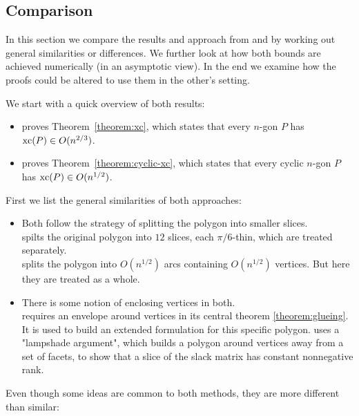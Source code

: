 \subsection{Comparison}

In this section we compare the results and approach from \cite{shitov2020sublinear} and \cite{kwan2020extension} by working out general similarities or differences. We further look at how both bounds are achieved numerically (in an asymptotic view). In the end we examine how the proofs could be altered to use them in the other's setting.

We start with a quick overview of both results:

\begin{itemize}
  \item \cite{shitov2020sublinear} proves Theorem~\ref{theorem:xc}, which states that every $n$-gon $P$ has $\operatorname{xc}(P) \in O(n^{2/3})$.
  \item \cite{kwan2020extension} proves Theorem~\ref{theorem:cyclic-xc}, which states that every cyclic $n$-gon $P$ has $\operatorname{xc}(P) \in O(n^{1/2})$.
\end{itemize}

First we list the general similarities of both approaches:

\begin{itemize}
  \item Both follow the strategy of splitting the polygon into smaller slices.\\
  \cite{shitov2020sublinear} spilts the original polygon into $12$ slices, each $\pi/6$-thin, which are treated separately.\\
  \cite{kwan2020extension} splits the polygon into $O(n^{1/2})$ arcs containing $O(n^{1/2})$ vertices. But here they are treated as a whole.

  \item There is some notion of enclosing vertices in both.\\
  \cite{shitov2020sublinear} requires an envelope around vertices in its central theorem \ref{theorem:glueing}. It is used to build an extended formulation for this specific polygon.
  \cite{kwan2020extension} uses a "lampshade argument", which builds a polygon around vertices away from a set of facets, to show that a slice of the slack matrix has constant nonnegative rank.
\end{itemize}

Even though some ideas are common to both methods, they are more different than similar:

